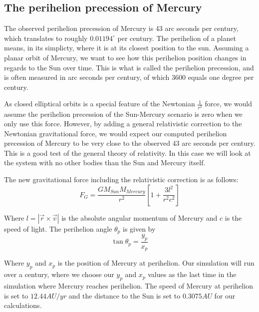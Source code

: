\documentclass[../main.tex]{subfiles}
\begin{document}
\subsection{The perihelion precession of Mercury}
The observed perihelion precession of Mercury is 43 arc seconds per century, which translates to roughly $0.01194^\circ$ per century. The perihelion of a planet means, in its simplicty, where it is at its closest position to the sun. Assuming a planar orbit of Mercury, we want to see how this perihelion position changes in regards to the Sun over time. This is what is called the perihelion precession, and is often measured in arc seconds per century, of which $3600$ equals one degree per century.

As closed elliptical orbits is a special feature of the Newtonian $\frac{1}{r^2}$ force, we would assume the perihelion precession of the Sun-Mercury scenario is zero when we only use this force. However, by adding a general relativistic correction to the Newtonian gravitational force, we would expect our computed perihelion precession of Mercury to be very close to the observed 43 arc seconds per century. This is a good test of the general theory of relativity. In this case we will look at the system with no other bodies than the Sun and Mercury itself.

The new gravitational force including the relativistic correction is as follows:
$$F_G = \frac{GM_{Sun}M_{Mercury}}{r^2} \left[ 1+\frac {3l^2}{r^2c^2} \right]$$


 Where $l = |\vec r \times \vec v|$ is the absolute angular momentum of Mercury and $c$ is the speed of light. The perihelion angle $\theta_p$ is given by
\[\tan \theta_p = \frac{y_p}{x_p}\]

Where $y_p$ and $x_p$ is the position of Mercury at perihelion. Our simulation will run over a century, where we choose our $y_p$ and $x_p$ values as the last time in the simulation where Mercury reaches perihelion. The speed of Mercury at perihelion is set to $12.44 AU/yr$ and the distance to the Sun is set to $0.3075 AU$ for our calculations.
\end{document}

